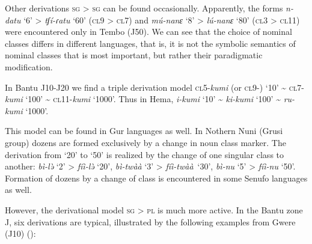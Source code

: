 Other derivations \textsc{sg} > \textsc{sg} can be found occasionally. Apparently, the forms \textit{n-datu} ‘6’ > \textit{tʃí-ɾatu} ‘60’ (\textsc{cl}9 > \textsc{cl}7) and \textit{mú-nanɛ}  ‘8’ > \textit{lú-nanɛ} ‘80’ (\textsc{cl}3 > \textsc{cl}11) were encountered only in Tembo (J50). We can see that the choice of nominal classes differs in different languages, that is, it is not the symbolic semantics of nominal classes that is most important, but rather their paradigmatic modification. 

In Bantu J10-J20 we find a triple derivation model \textsc{cl}5-\textit{kumi} (or \textsc{cl}9-) ‘10’ {\textasciitilde} \textsc{cl}7-\textit{kumi} ‘100’ {\textasciitilde} \textsc{cl}11-\textit{kumi} ‘1000’. Thus in Hema, \textit{i-kumi} ‘10’ {\textasciitilde} \textit{ki-kumi} ‘100’ {\textasciitilde} \textit{ru-kumi} ‘1000’.

This model can be found in Gur languages as well. In Nothern Nuni (Grusi group) dozens are formed exclusively by a change in noun class marker. The derivation from ‘20’ to ‘50’ is realized by the change of one singular class to another: \textit{bì-l{\`{ə}}} ‘2’ > \textit{fíì-l{\`{ə}}} ‘20’, \textit{bì-tw{\`{a}}{\`{a}}} ‘3’ > \textit{fíì-tw{\`{a}}{\`{a}}}~‘30’, \textit{bì-nu} ‘5’ > \textit{fíì-nu} ‘50’. Formation of dozens by a change of class is encountered in some Senufo languages as well. 

However, the derivational model \textsc{sg} > \textsc{pl} is much more active. In the Bantu zone J, six derivations are typical, illustrated by the following examples from Gwere (J10) (): 


\begin{table}
\caption{\label{tab:1:23} Gwere number patterns in the derivations of numerals}

\end{table}


